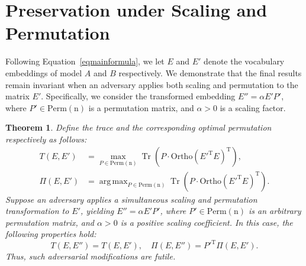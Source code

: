 \documentclass{article} %
\DeclareMathOperator*{\argmax}{arg\,max}
\DeclareMathOperator{\Tr}{Tr}
\newtheorem{thm}{Theorem}
\begin{document}
\section{Preservation under Scaling and Permutation}
\label{sec:preservation_under_scaling_and_permutation}
Following Equation~\ref{eqmainformula}, we let $E$ and $E'$ denote the vocabulary embeddings of model $A$ and $B$ respectively. 
We demonstrate that the final results remain invariant when an adversary applies both scaling and permutation to the matrix $E'$. 
Specifically, we consider the transformed embedding $E'' = \alpha E' P'$, where $P' \in \mathrm{Perm}(\mathrm{n})$ is a permutation matrix, and $\alpha > 0$ is a scaling factor.
\begin{thm}
Define the trace and the corresponding optimal permutation respectively as follows:
\[
\begin{aligned}
    T(E, E') &= \max_{P \in \mathrm{Perm}(\mathrm{n})} \Tr\left(P \cdot \mathrm{Ortho}\left(E'^{\text{T}} E\right)^{\text{T}}\right), \\
    \Pi(E, E') &= \argmax_{P \in \mathrm{Perm}(\mathrm{n})} \Tr\left(P \cdot \mathrm{Ortho}\left(E'^{\text{T}} E\right)^{\text{T}}\right).
\end{aligned}
\]
Suppose an adversary applies a simultaneous scaling and permutation transformation to $E'$, yielding $E'' = \alpha E' P'$, where $P' \in \mathrm{Perm}(\mathrm{n})$ is an arbitrary permutation matrix, and $\alpha > 0$ is a positive scaling coefficient. In this case, the following properties hold:
\[
T(E, E'') = T(E, E'), \quad \Pi(E, E'') = P'^{\text{T}} \Pi(E, E').
\]
Thus, such adversarial modifications are futile.
\end{thm}
\end{document}
